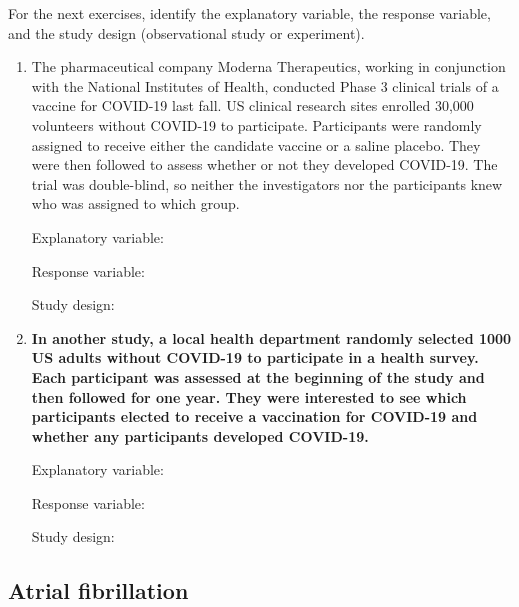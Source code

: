 \documentclass[
]{report}
\begin{document}
For the next exercises, identify the explanatory variable, the response variable, and the study design (observational study or experiment).

\newpage

\begin{enumerate}
\def\labelenumi{\arabic{enumi}.}
\item
  The pharmaceutical company Moderna Therapeutics, working in conjunction with the National Institutes of Health, conducted Phase 3 clinical trials of a vaccine for COVID-19 last fall. US clinical research sites enrolled 30,000 volunteers without COVID-19 to participate. Participants were randomly assigned to receive either the candidate vaccine or a saline placebo. They were then followed to assess whether or not they developed COVID-19. The trial was double-blind, so neither the investigators nor the participants knew who was assigned to which group.
  \vspace{0.1in}

  Explanatory variable:
  \vspace{0.25in}

  Response variable:
  \vspace{0.25in}

  Study design:
  \vspace{0.25in}
\item
  \textbf{In another study, a local health department randomly selected 1000 US adults without COVID-19 to participate in a health survey. Each participant was assessed at the beginning of the study and then followed for one year. They were interested to see which participants elected to receive a vaccination for COVID-19 and whether any participants developed COVID-19.}
  \vspace{0.1in}

  Explanatory variable:
  \vspace{0.25in}

  Response variable:
  \vspace{0.25in}

  Study design:
  \vspace{0.25in}
\end{enumerate}

\hypertarget{atrial-fibrillation}{%
\subsection*{Atrial fibrillation}\label{atrial-fibrillation}}
\end{document}
